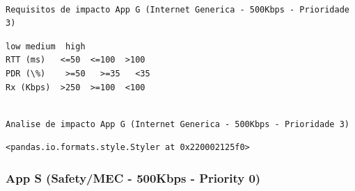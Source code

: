 \documentclass[11pt]{article}
\begin{document}
    \begin{Verbatim}[commandchars=\\\{\}]

Requisitos de impacto App G (Internet Generica - 500Kbps - Prioridade 3)

    \end{Verbatim}

    
    \begin{Verbatim}[commandchars=\\\{\}]
            low medium  high
RTT (ms)   <=50  <=100  >100
PDR (\%)    >=50   >=35   <35
Rx (Kbps)  >250  >=100  <100
    \end{Verbatim}

    
    \begin{Verbatim}[commandchars=\\\{\}]

Analise de impacto App G (Internet Generica - 500Kbps - Prioridade 3)

    \end{Verbatim}

    
    \begin{Verbatim}[commandchars=\\\{\}]
<pandas.io.formats.style.Styler at 0x220002125f0>
    \end{Verbatim}

    
    \hypertarget{app-s-safetymec---500kbps---priority-0}{%
\subsubsection{App S (Safety/MEC - 500Kbps - Priority
0)}\label{app-s-safetymec---500kbps---priority-0}}
\end{document}
